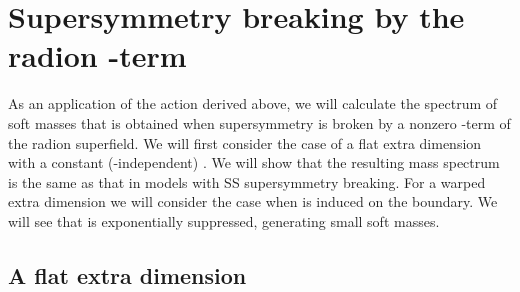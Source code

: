 \documentclass[a4paper,12pt]{article}
\begin{document}
\section{Supersymmetry breaking by the radion \coordHE{}-term}



As an application of the action derived above, we will calculate the 
spectrum of soft masses that is obtained when supersymmetry is broken
by a nonzero  \coordHE{}-term  of the radion superfield.
We will first consider the case of a flat extra dimension
with a constant (\coordHE{}-independent)
  \coordHE{}.
We will show that the resulting mass 
spectrum is the same as that in models with  SS supersymmetry breaking.
For a 
warped extra dimension we will consider the case when
 \coordHE{} is induced on the boundary. 
We will see that 
\coordHE{} is
 exponentially suppressed,
generating  small soft masses.



\subsection{A flat extra dimension}
\end{document}
